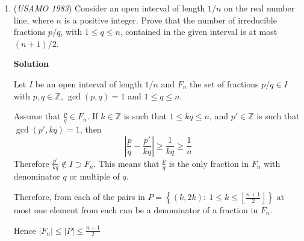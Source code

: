 \begin{enumerate}
 Let $Y'$ be the intersection of $A_BX'$ with $C'D'$. Then the altitude length we seek to construct is, from the Pythagorean Theorem, $\sqrt{|A_BY'|^2-|X'Y'|^2}$. We can directly apply Lemma 2 to segment $A_BY'X'$ to obtain this segment. This shows how to construct a segment of length $A'X'$.

 


	\item (\textit{USAMO 1983}) Consider an open interval of length $1/n$ on the real number line, where $n$ is a positive integer. Prove that the number of irreducible fractions $p/q$, with $1\le q\le n$, contained in the given interval is at most $(n+1)/2$.


 



\textbf{Solution}

Let $I$ be an open interval of length $1/n$ and $F_n$ the set of fractions $p/q\in I$ with $p,q\in\mathbb{Z}$, $\gcd(p,q)=1$ and $1\leq q\leq n$. 

 Assume that $\frac{p}{q}\in F_n$. If $k\in\mathbb{Z}$ is such that $1\leq kq\leq n$, and $p'\in\mathbb{Z}$ is such that $\gcd(p',kq)=1$, then
 \[\left|\frac{p}{q}-\frac{p'}{kq}\right|\geq\frac{1}{kq}\geq \frac{1}{n}\]Therefore $\frac{p'}{kq}\notin I\supset F_n$. This means that $\frac{p}{q}$ is the only fraction in $F_n$ with denominator $q$ or multiple of $q$.

 Therefore, from each of the pairs in $P=\left\{(k,2k):\ 1\leq k\leq \left\lfloor\frac{n+1}{2}\right\rfloor\right\}$ at most one element from each can be a denominator of a fraction in $F_n$.

 Hence $|F_n|\leq |P|\leq\frac{n+1}{2}$



\end{enumerate}